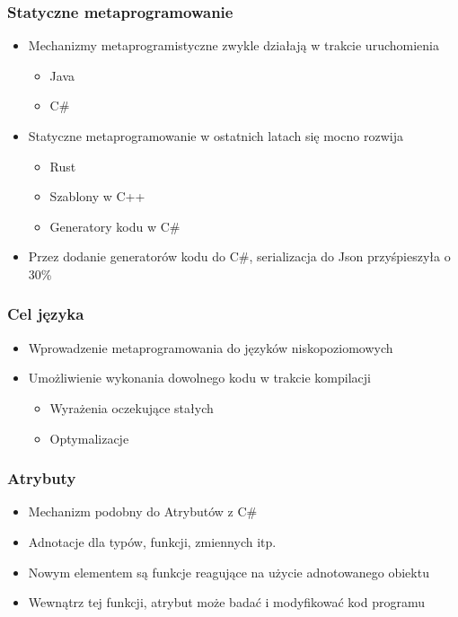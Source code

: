 \begin{frame}
	\frametitle{Statyczne metaprogramowanie}

	\begin{itemize}
		\item Mechanizmy metaprogramistyczne zwykle działają w trakcie uruchomienia\begin{itemize}
			\item Java
			\item C\#
		\end{itemize}
		\item Statyczne metaprogramowanie w ostatnich latach się mocno rozwija\begin{itemize}
			\item Rust
			\item Szablony w C++
			\item Generatory kodu w C\#
		\end{itemize}
		\item Przez dodanie generatorów kodu do C\#, serializacja do Json przyśpieszyła o 30\%
	\end{itemize}

\end{frame}

\begin{frame}
	\frametitle{Cel języka}

	\begin{itemize}
		\item Wprowadzenie metaprogramowania do języków niskopoziomowych
		\item Umożliwienie wykonania dowolnego kodu w trakcie kompilacji\begin{itemize}
			\item Wyrażenia oczekujące stałych
			\item Optymalizacje
		\end{itemize}
	\end{itemize}

\end{frame}

\begin{frame}
	\frametitle{Atrybuty}

	\begin{itemize}
		\item Mechanizm podobny do Atrybutów z C\#
		\item Adnotacje dla typów, funkcji, zmiennych itp.
		\item Nowym elementem są funkcje reagujące na użycie adnotowanego obiektu
		\item Wewnątrz tej funkcji, atrybut może badać i modyfikować kod programu
	\end{itemize}

\end{frame}

